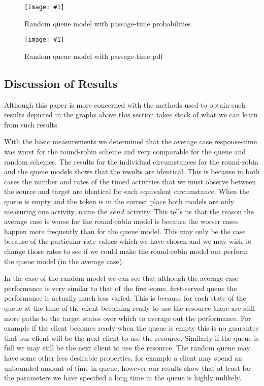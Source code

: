 \documentclass[times, 10pt,twocolumn]{article}
\newcommand{\graphicfigure}[3]{
\begin{figure}
\texttt{[image: \#1]}
\caption{
\label{#2}
#3
}
\end{figure}
}
\newcommand{\quoteActivity}[1]{$#1$}
\begin{document}
% 

\graphicfigure{random_cdf.pdf}
              {figure:random:cdf}
              {Random queue model with passage-time probabilities}

\graphicfigure{random_pdf.pdf}
              {figure:random:pdf}
              {Random queue model with passage-time pdf}



\subsection{Discussion of Results}

Although this paper is more concerned with the methods used to
obtain such results depicted in the graphs above this section
takes stock of what we can learn from such results.

With the basic measurements we determined that the average case
response-time was worst for the round-robin scheme and very
comparable for the queue and random schemes.
The results for the individual circumstances for the round-robin
and the queue models shows that the results are identical.
This is because in both cases the number and rates of the timed
activities that we must observe between the source and target
are identical for each equivalent circumstance. When the queue is
empty and the token is in the correct place both models are only
measuring one activity, name the \quoteActivity{send} activity.
This tells us that the reason the average case is worse for the
round-robin model is because the worser cases happen more frequently
than for the queue model. This may only be the case because of the
particular rate values which we have chosen and we may wish to 
change those rates to see if we could make the round-robin model
out perform the queue model (in the average case).

In the case of the random model we can see that although the
average case performance is very similar to that of the
first-come, first-served queue the performance is actually much
less varied. This is because for each state of the queue at the
time of the client becoming ready to use the resource there are
still more paths to the target states over which to average out
the performance. For example if the client becomes ready when the
queue is empty this is no guarantee that our client will be the next
client to use the resource. Similarly if the queue is full we may
still be the next client to use the resource. The random queue may
have some other less desirable properties, for example a client may
spend an unbounded amount of time in queue, however our results show
that at least for the parameters we have specified a long time in the
queue is highly unlikely.
\end{document}
